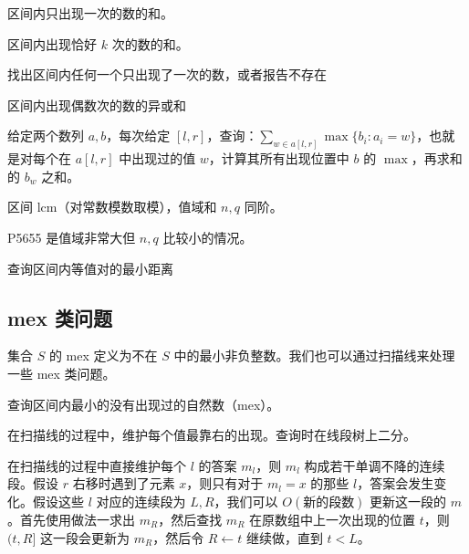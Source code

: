 \begin{exercise}
    区间内只出现一次的数的和。
\end{exercise}
\begin{exercise}
    区间内出现恰好 $k$ 次的数的和。
\end{exercise}
\begin{exercise}[CF1000F]
    找出区间内任何一个只出现了一次的数，或者报告不存在
\end{exercise}
\begin{exercise}
    区间内出现偶数次的数的异或和
\end{exercise}






\begin{example}
    给定两个数列 $a,b$，每次给定 $[l,r]$，查询：$\sum_{w\in a[l,r]} \max\{b_i:a_i=w\}$，也就是对每个在 $a[l,r]$ 中出现过的值 $w$，计算其所有出现位置中 $b$ 的 $\max$，再求和 的 $b_w$ 之和。
\end{example}
\begin{exercise}[CF1422F]
    区间 lcm（对常数模数取模），值域和 $n,q$ 同阶。
\end{exercise}
\begin{remark}
    P5655 是值域非常大但 $n,q$ 比较小的情况。
\end{remark}


\begin{exercise}[CF522D]
    查询区间内等值对的最小距离
\end{exercise}


\subsection{mex 类问题}

集合 $S$ 的 mex 定义为不在 $S$ 中的最小非负整数。我们也可以通过扫描线来处理一些 mex 类问题。
\begin{example}[区间 mex]
    查询区间内最小的没有出现过的自然数（mex）。
\end{example}
\begin{solution}[做法一]
    在扫描线的过程中，维护每个值最靠右的出现。查询时在线段树上二分。
\end{solution}
\begin{solution}[做法二]
    在扫描线的过程中直接维护每个 $l$ 的答案 $m_l$，则 $m_l$ 构成若干单调不降的连续段。假设 $r$ 右移时遇到了元素 $x$，则只有对于 $m_l=x$ 的那些 $l$，答案会发生变化。假设这些 $l$ 对应的连续段为 $L,R$，我们可以 $O(\textbf{新的段数})$ 更新这一段的 $m$。首先使用做法一求出 $m_R$，然后查找 $m_R$ 在原数组中上一次出现的位置 $t$，则 $(t,R]$ 这一段会更新为 $m_R$，然后令 $R\gets t$ 继续做，直到 $t<L$。 
\end{solution}

